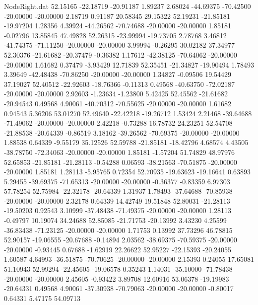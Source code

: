 \begin{filecontents}{NodeRight.dat}
  52.15165  -22.18719  -20.91187     1.89237    2.68024  -44.69375  -70.42500  -20.00000  -20.00000    2.18719    0.91187   20.58345   29.15322
  52.19231  -21.85181  -19.97204     1.28356    4.39924  -44.26562  -70.74688  -20.00000  -20.00000    1.85181   -0.02796   13.85845   47.49828
  52.26315  -23.99994  -19.73705     2.78768    3.46812  -41.74375  -71.11250  -20.00000  -20.00000    3.99994   -0.26295   30.02182   37.34977
  52.30376  -21.61682  -20.37479    -0.36382    1.17612  -42.38125  -70.64062  -20.00000  -20.00000    1.61682    0.37479   -3.93429   12.71839
  52.35451  -21.34827  -19.90494     1.78493    3.39649  -42.48438  -70.86250  -20.00000  -20.00000    1.34827   -0.09506   19.54429   37.19027
  52.40512  -22.92603  -18.76366    -0.11313    0.49568  -40.63750  -72.02187  -20.00000  -20.00000    2.92603   -1.23634   -1.23800    5.42425
  52.45562  -21.61682  -20.94543     0.49568    4.90061  -40.70312  -70.55625  -20.00000  -20.00000    1.61682    0.94543    5.36206   53.01270
  52.49640  -22.42218  -19.26712     1.53424    2.21468  -39.64688  -71.49062  -20.00000  -20.00000    2.42218   -0.73288   16.78732   24.23251
  52.54708  -21.88538  -20.64339    -0.86519    3.18162  -39.26562  -70.69375  -20.00000  -20.00000    1.88538    0.64339   -9.55179   35.12526
  52.59788  -21.85181  -18.42796     4.68574    4.43505  -38.78750  -72.34063  -20.00000  -20.00000    1.85181   -1.57204   51.74829   48.97976
  52.65853  -21.85181  -21.28113    -0.54288    0.06593  -38.21563  -70.51875  -20.00000  -20.00000    1.85181    1.28113   -5.95765    0.72354
  52.70935  -19.63623  -19.16641     0.63893    5.29455  -39.69375  -71.65313  -20.00000  -20.00000   -0.36377   -0.83359    6.97303   57.78254
  52.75984  -22.32178  -20.64339     1.31937    1.78493  -37.64688  -70.85938  -20.00000  -20.00000    2.32178    0.64339   14.42749   19.51848
  52.80031  -21.28113  -19.50203     0.92543    3.10999  -37.48438  -71.49375  -20.00000  -20.00000    1.28113   -0.49797   10.19074   34.24688
  52.85085  -21.71753  -20.13992     3.43230    4.25599  -36.83438  -71.23125  -20.00000  -20.00000    1.71753    0.13992   37.73296   46.78815
  52.90157  -19.06555  -20.67688    -0.14894    2.03562  -38.69375  -70.59375  -20.00000  -20.00000   -0.93445    0.67688   -1.62919   22.26622
  52.95227  -22.15393  -20.24055     1.60587    4.64993  -36.51875  -70.70625  -20.00000  -20.00000    2.15393    0.24055   17.65081   51.10943
  52.99294  -22.45605  -19.06578     0.35243    1.14031  -35.10000  -71.78438  -20.00000  -20.00000    2.45605   -0.93422    3.89708   12.60916
  53.06378  -19.19983  -20.64331     0.49568    4.90061  -37.30938  -70.79063  -20.00000  -20.00000   -0.80017    0.64331    5.47175   54.09713

\end{filecontents}
